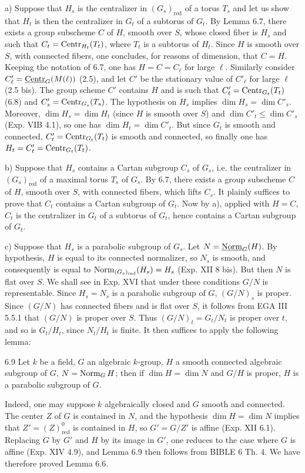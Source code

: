 \noindent a) Suppose that $H_s$ is the centralizer in $(G_s)_{\mathrm{red}}$ of a torus $T_s$ and let us show that $H_t$ is then the centralizer in $G_t$ of a subtorus of $G_t$. By Lemma 6.7, there exists a group subscheme $C$ of $H$, smooth over $S$, whose closed fiber is $H_s$ and such that $C_t=\operatorname{Centr}_{H_t}(T_t)$, where $T_t$ is a subtorus of $H_t$. Since $H$ is smooth over $S$, with connected fibers, one concludes, for reasons of dimension, that $C=H$. Keeping the notation of 6.7, one has $H=C=C_\ell$ for large $\ell$. Similarly consider $C'_\ell=\underline{\mathrm{Centr}}_G(M(\ell))$ (2.5), and let $C'$ be the stationary value of $C'_\ell$ for large $\ell$ (2.5 bis). The group scheme $C'$ contains $H$ and is such that $C'_t=\operatorname{Centr}_{G_t}(T_t)$ (6.8) and $C'_s=\operatorname{Centr}_{G_s}(T_s)$. The hypothesis on $H_s$ implies $\dim H_s=\dim C'_s$. Moreover, $\dim H_s=\dim H_t$ (since $H$ is smooth over $S$) and $\dim C'_t\leq\dim C'_s$ (Exp. VIB 4.1), so one has $\dim H_t=\dim C'_t$. But since $G_t$ is smooth and connected, $C'_t=\operatorname{Centr}_{G_t}(T_t)$ is smooth and connected, so finally one has $H_t=C'_t=\operatorname{Centr}_{G_t}(T_t)$.

\noindent b) Suppose that $H_s$ contains a Cartan subgroup $C_s$ of $G_s$, i.e. the centralizer in $(G_s)_{\mathrm{red}}$ of a maximal torus $T_s$ of $G_s$. By 6.7, there exists a group subscheme $C$ of $H$, smooth over $S$, with connected fibers, which lifts $C_s$. It plainly suffices to prove that $C_t$ contains a Cartan subgroup of $G_t$. Now by a), applied with $H=C$, $C_t$ is the centralizer in $G_t$ of a subtorus of $G_t$, hence contains a Cartan subgroup of $G_t$.

\noindent c) Suppose that $H_s$ is a parabolic subgroup of $G_s$. Let $N=\underline{\mathrm{Norm}}_G(H)$. By hypothesis, $H$ is equal to its connected normalizer, so $N_s$ is smooth, and consequently is equal to $\operatorname{Norm}_{(G_s)_{\mathrm{red}}}(H_s)=H_s$ (Exp. XII 8 bis). But then $N$ is flat over $S$. We shall see in Exp. XVI that under these conditions $G/N$ is representable. Since $H_s=N_s$ is a parabolic subgroup of $G$, $(G/N)_s$ is proper. Since $(G/N)$ has connected fibers and is flat over $S$, it follows from EGA III 5.5.1 that $(G/N)$ is proper over $S$. Thus $(G/N)_t=G_t/N_t$ is proper over $t$, and so is $G_t/H_t$, since $N_t/H_t$ is finite. It then suffices to apply the following lemma:
\begin{lemma}{6.9}\label{XV.6.9}
Let $k$ be a field, $G$ an algebraic $k$-group, $H$ a smooth connected algebraic subgroup of $G$, $N=\operatorname{Norm}_G H$; then if $\dim H=\dim N$ and $G/H$ is proper, $H$ is a parabolic subgroup of $G$.
\end{lemma}
Indeed, one may suppose $k$ algebraically closed and $G$ smooth and connected. The center $Z$ of $G$ is contained in $N$, and the hypothesis $\dim H=\dim N$ implies that $Z'=(Z)^0_{\mathrm{red}}$ is contained in $H$, so $G'=G/Z'$ is affine (Exp. XII 6.1). Replacing $G$ by $G'$ and $H$ by its image in $G'$, one reduces to the case where $G$ is affine (Exp. XIV 4.9), and Lemma 6.9 then follows from BIBLE 6 Th. 4. We have therefore proved Lemma 6.6.

